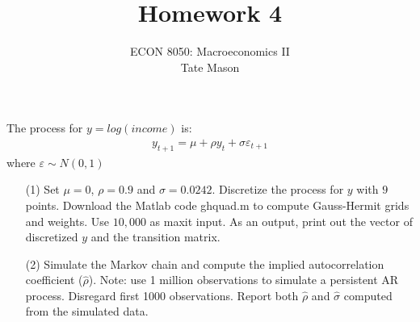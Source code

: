 \documentclass[10pt,a4paper]{article}
\begin{document}
\title{Homework 4}
\author{ECON 8050: Macroeconomics II \\ Tate Mason}
\date{}
\maketitle

The process for $y = log(income)$ is:
\begin{align*}
    y_{t+1} = \mu + \rho y_t + \sigma \varepsilon_{t+1}
\end{align*}
where $\varepsilon \sim N(0, 1)$

\begin{enumerate}
    \item[(1)] Set $\mu = 0$, $\rho = 0.9$ and $\sigma = 0.0242$. Discretize the process for $y$ with $9$ points. Download the Matlab code ghquad.m to compute Gauss-Hermit grids and weights. Use $10,000$ as maxit input. As an output, print out the vector of discretized $y$ and the transition matrix.
    
    \item[(2)] Simulate the Markov chain and compute the implied autocorrelation coefficient ($\hat{\rho}$). Note: use 1 million observations to simulate a persistent AR process. Disregard first 1000 observations. Report both $\hat{\rho}$ and $\hat{\sigma}$ computed from the simulated data.
\end{enumerate}
\end{document}
